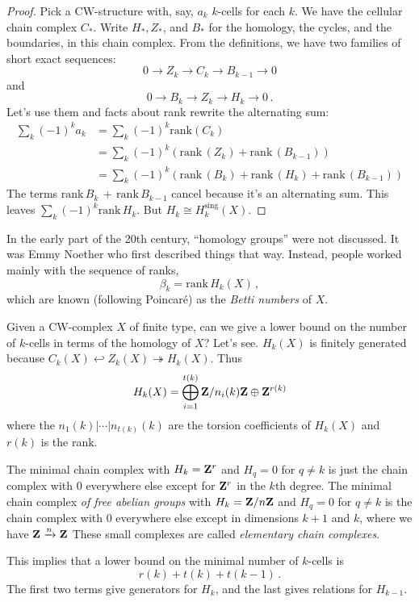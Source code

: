 \begin{proof}
Pick a CW-structure with, say, $a_k$ $k$-cells for each $k$. We have the 
cellular chain complex $C_*$. Write $H_*,Z_*$, and $B_*$ for the homology,
the cycles, and the boundaries, in this chain complex. From the definitions, 
we have two families of short exact sequences: 
\[
0\to Z_k\to C_k\to B_{k-1}\to 0
\]
and
\[
0\to B_k\to Z_k\to H_k\to 0\,.
\]
Let's use them and facts about rank rewrite the alternating sum:
\begin{align*}
\sum_k (-1)^ka_k & = \sum_k(-1)^k\mathrm{rank}(C_k)\\
& = \sum_k(-1)^k(\mathrm{rank}\,(Z_k)+\mathrm{rank}\,(B_{k-1}))\\
& = \sum_k(-1)^k(\mathrm{rank}\,(B_k)+\mathrm{rank}\,(H_k)+
\mathrm{rank}\,(B_{k-1}))
\end{align*}
The terms $\mathrm{rank}\,B_k\,+\,\mathrm{rank}\,B_{k-1}$ cancel because it's an alternating sum. This leaves $\sum_k(-1)^k\mathrm{rank}\,H_k$. But 
$H_k\cong H_k^\text{sing}(X)$.
\end{proof}

In the early part of the 20th century, ``homology groups'' were not discussed. 
It was Emmy Noether who first described things that way. Instead, 
people worked mainly with the sequence of ranks, 
\[
\beta_k=\mathrm{rank}\,H_k(X)\,,
\]
which are known (following Poincar\'e) as the {\em Betti numbers} of $X$.

Given a CW-complex $X$ of finite type, can we give a lower bound on the number of $k$-cells in terms of the homology of $X$? Let's see. $H_k(X)$ is finitely generated because $C_k(X)\hookleftarrow Z_k(X)\twoheadrightarrow H_k(X)$. Thus 
\[
H_k(X)=\bigoplus^{t(k)}_{i=1}\mathbf Z/n_i(k)\mathbf Z\oplus \mathbf Z^{r(k)}
\]
where the $n_1(k)|\cdots|n_{t(k)}(k)$ are the torsion coefficients of $H_k(X)$ 
and $r(k)$ is the rank.

The minimal chain complex with $H_k=\mathbf Z^r$ and $H_q=0$ for $q\neq k$ is just the chain complex with $0$ everywhere else except for $\mathbf Z^r$ in the $k$th degree. The minimal chain complex {\em of free abelian groups} with $ H_k=\mathbf Z/n\mathbf Z$ and $ H_q=0$ for $q\neq k$ is the chain complex with $0$ everywhere else except in dimensions $k+1$ and $k$, where we have $\mathbf Z\xrightarrow{n}\mathbf Z$ 
These small complexes are called {\em elementary chain complexes}.

This implies that
a lower bound on the minimal number of $k$-cells is 
\[
r(k)+t(k)+t(k-1)\,.
\]
The first two terms give generators for $H_k$, and the last gives relations
for $H_{k-1}$.

